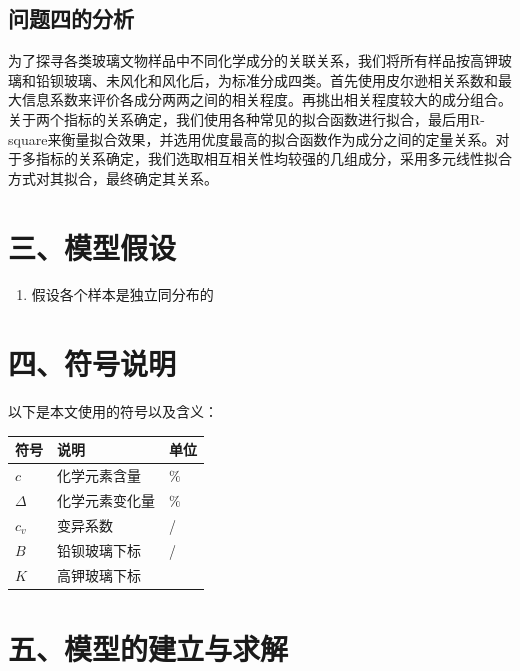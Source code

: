 \documentclass{my_paper}
\begin{document}
\subsection{问题四的分析}
为了探寻各类玻璃文物样品中不同化学成分的关联关系，我们将所有样品按高钾玻璃和铅钡玻璃、未风化和风化后，为标准分成四类。首先使用皮尔逊相关系数和最大信息系数来评价各成分两两之间的相关程度。再挑出相关程度较大的成分组合。关于两个指标的关系确定，我们使用各种常见的拟合函数进行拟合，最后用R-square来衡量拟合效果，并选用优度最高的拟合函数作为成分之间的定量关系。对于多指标的关系确定，我们选取相互相关性均较强的几组成分，采用多元线性拟合方式对其拟合，最终确定其关系。
\section{三、模型假设}
\begin{enumerate}
    \item 假设各个样本是独立同分布的
    
 


\end{enumerate}

\section{四、符号说明}


以下是本文使用的符号以及含义：
\begin{table}[h]%
    \centering
    \begin{tabular}{p{2.0cm}<{\centering}p{9.0cm}<{\centering}p{2.0cm}<{\centering}}
    \hline
    符号 & 说明 & 单位 \\ %
    \hline
    $c$ & 化学元素含量 &  $\%$\\
    $\Delta$ & 化学元素变化量 &  $\%$\\
    $c_v$ & 变异系数 &  /\\
    $B$ & 铅钡玻璃下标 & / \\
    $K$ & 高钾玻璃下标 &  \\
    \hline
    \end{tabular}
\end{table}

\section{五、模型的建立与求解}
\end{document}
